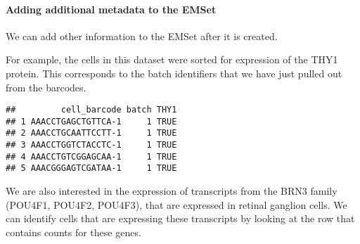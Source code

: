 \documentclass[]{article}
\newenvironment{Shaded}{\begin{snugshade}}{\end{snugshade}}
\newcommand{\DecValTok}[1]{\textcolor[rgb]{0.00,0.00,0.81}{#1}}
\newcommand{\KeywordTok}[1]{\textcolor[rgb]{0.13,0.29,0.53}{\textbf{#1}}}
\newcommand{\NormalTok}[1]{#1}
\newcommand{\OperatorTok}[1]{\textcolor[rgb]{0.81,0.36,0.00}{\textbf{#1}}}
\newcommand{\StringTok}[1]{\textcolor[rgb]{0.31,0.60,0.02}{#1}}
\let\oldparagraph\paragraph
\renewcommand{\paragraph}[1]{\oldparagraph{#1}\mbox{}}
\begin{document}
\hypertarget{adding-additional-metadata-to-the-emset}{%
\paragraph{Adding additional metadata to the
EMSet}\label{adding-additional-metadata-to-the-emset}}

We can add other information to the EMSet after it is created.

For example, the cells in this dataset were sorted for expression of the
THY1 protein. This corresponds to the batch identifiers that we have
just pulled out from the barcodes.

\begin{Shaded}
\end{Shaded}

\begin{verbatim}
##         cell_barcode batch THY1
## 1 AAACCTGAGCTGTTCA-1     1 TRUE
## 2 AAACCTGCAATTCCTT-1     1 TRUE
## 3 AAACCTGGTCTACCTC-1     1 TRUE
## 4 AAACCTGTCGGAGCAA-1     1 TRUE
## 5 AAACGGGAGTCGATAA-1     1 TRUE
\end{verbatim}

We are also interested in the expression of transcripts from the BRN3
family (POU4F1, POU4F2, POU4F3), that are expressed in retinal ganglion
cells. We can identify cells that are expressing these transcripts by
looking at the row that contains counts for these genes.
\end{document}
